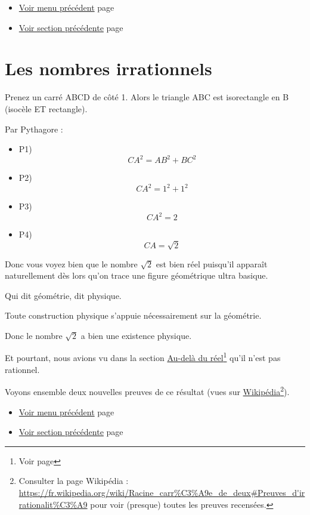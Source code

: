 \documentclass[a4paper,11pt]{book}
\begin{document}
\begin{itemize}
\item \hyperref[orgc112f4f]{Voir menu précédent}
page~\pageref{page:content6-menu}
\item \hyperref[org76d4ecb]{Voir section précédente}
page~\pageref{page:sec2.6.2exo10}
\end{itemize}


\clearpage

\section{Les nombres irrationnels}
\label{sec:orgd21e862}
\label{orgb8d930f}
\label{page:sec2.6.4irr}

Prenez un carré ABCD de côté 1. Alors le triangle ABC est
isorectangle en B (isocèle ET rectangle).

Par Pythagore :


\begin{itemize}
\item P1) \[CA^2 = AB^2 + BC^2\]
\item P2) \[CA^2 = 1^2 + 1^2\]
\item P3) \[CA^2 = 2\]
\item P4) \[CA = \sqrt{2}\]
\end{itemize}


Donc vous voyez bien que le nombre \(\sqrt{2}\) est bien réel
puisqu'il apparaît naturellement dès lors qu'on trace une figure
géométrique ultra basique.

Qui dit géométrie, dit physique.

Toute construction physique s'appuie nécessairement sur la géométrie.

Donc le nombre \(\sqrt{2}\) a bien une existence physique.

Et pourtant, nous avions vu dans la section \hyperref[orgff5d9b3]{Au-delà du
réel}\footnote{Voir page \pageref{page:sec2.1.5real}} qu'il n'est pas rationnel.

Voyons ensemble deux nouvelles preuves de ce résultat (vues sur
\href{https://fr.wikipedia.org/wiki/Racine\_carr\%C3\%A9e\_de\_deux\#Preuves\_d'irrationalit\%C3\%A9}{Wikipédia}\footnote{Consulter la page Wikipédia :
\url{https://fr.wikipedia.org/wiki/Racine\_carr\%C3\%A9e\_de\_deux\#Preuves\_d'irrationalit\%C3\%A9}
pour voir (presque) toutes les preuves recensées.}).

\begin{itemize}
\item \hyperref[orgc112f4f]{Voir menu précédent}
page~\pageref{page:content6-menu}
\item \hyperref[org36b98de]{Voir section précédente}
page~\pageref{page:sec2.6.3tip}
\end{itemize}
\end{document}
